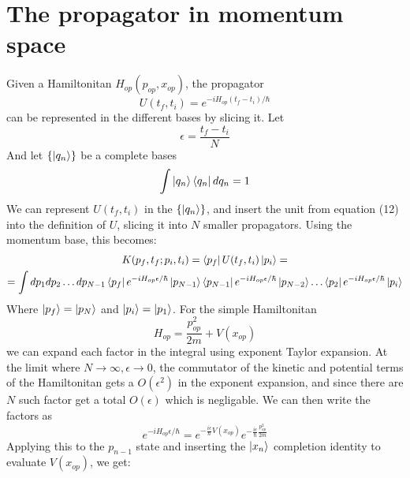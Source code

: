 \documentclass{article}
\begin{document}
\section{The propagator in momentum space}
Given a Hamiltonitan $H_{op}(p_{op}, x_{op})$, the propagator
\begin{equation}
    U(t_f, t_i) = e^{-i H_{op}(t_f - t_i) / \hbar}
\end{equation}
can be represented in the different bases by slicing it. Let
\begin{equation}
    \epsilon = \frac{t_f - t_i}{N}
\end{equation}
And let $\left\{\ket{q_n}\right\}$ be a complete bases
\begin{equation}
    \int \ket{q_n}\bra{q_n} dq_n = 1
\end{equation}
We can represent $U(t_f, t_i)$ in the $\left\{\ket{q_n}\right\}$, and insert the unit from equation (12) into the definition of $U$, slicing it into $N$ smaller propagators. Using the momentum base, this becomes:
\begin{equation}
\begin{gathered}
    K(p_f, t_f; p_i, t_i) = \bra{p_f}U(t_f, t_i)\ket{p_i} = 
    \\
    = \int dp_1 dp_2\dots dp_{N-1}
        \bra{p_f} e^{-i H_{op}\epsilon / \hbar} \ket{p_{N-1}}
        \bra{p_{N-1}} e^{-i H_{op}\epsilon / \hbar} \ket{p_{N-2}}
        \dots
        \bra{p_2} e^{-i H_{op}\epsilon / \hbar} \ket{p_i}
\end{gathered}
\end{equation}
Where $\ket{p_f} = \ket{p_N}$ and $\ket{p_i} = \ket{p_1}$.
\newline
For the simple Hamiltonitan
\begin{equation}
    H_{op} = \frac{p_{op}^2}{2m} + V(x_{op})
\end{equation}
we can expand each factor in the integral using exponent Taylor expansion. At the limit where $N\rightarrow \infty, \epsilon \rightarrow 0$, the commutator of the kinetic and potential terms of the Hamiltonitan gets a $O(\epsilon^2)$ in the exponent expansion, and since there are $N$ such factor get a total $O(\epsilon)$ which is negligable. We can then write the factors as
\begin{equation}
    e^{-i H_{op}\epsilon / \hbar} = 
        e^{-\frac{i\epsilon}{\hbar}V(x_{op})}
        e^{-\frac{i\epsilon}{\hbar}\frac{p_{op}^2}{2m}}
\end{equation}
Applying this to the $p_{n-1}$ state and inserting the $\ket{x_n}$ completion identity to evaluate $V(x_{op})$, we get:
\end{document}
